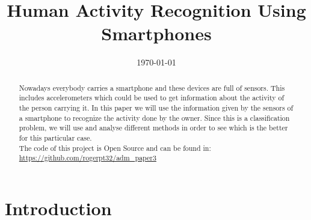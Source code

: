 \documentclass[conference]{IEEEtran}
\begin{document}
\title{Human Activity Recognition Using Smartphones}

\author{
}

\date{\today}

\maketitle

\begin{abstract}
Nowadays everybody carries a smartphone and these devices are full of sensors. This includes accelerometers which could be used to get information about the activity of the person carrying it. In this paper we will use the information given by the sensors of a smartphone to recognize the activity done by the owner. Since this is a classification problem, we will use and analyse different methods in order to see which is the better for this particular case.\\
The code of this project is Open Source and can be found in: \url{https://github.com/rogerpt32/adm_paper3}
\end{abstract}

\section{Introduction}

% 
% 
\end{document}
